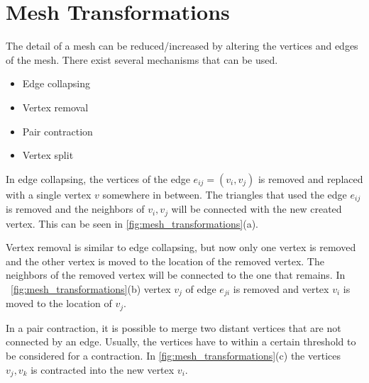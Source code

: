 \iffalse %

============================
 Mesh simplification
============================
* Geometry
  - Mesh decimation
  - Mesh optimization
  - Progressive meshes
  - Surface simplification using quadric error metric
  
* Geometry and appearance attributes
  - Appearance-preserving simplification

  - Texture mapped progressive meshes
  
  - Simplifying surfaces with color and texture using quadric error metric
  - New quadric error metric

  - Image-driven simplification

============================
 Mesh parametrization
============================
  Resample texture
  Ray tracing
  Volume UV
  
\fi %
  
\iffalse %
\section{Mesh Transformations} \label{sec:mesh_transformations}
The detail of a mesh can be reduced/increased by altering the vertices and edges of the mesh. There exist several mechanisms that can be used.

\begin{itemize}
\item Edge collapsing
\item Vertex removal
\item Pair contraction
\item Vertex split
\end{itemize}

In edge collapsing, the vertices of the edge $e_{ij} = (v_i, v_j)$ is removed and replaced with a single vertex $v$ somewhere in between. The triangles that used the edge $e_{ij}$ is removed and the neighbors of $v_i, v_j$ will be connected with the new created vertex. This can be seen in \cref{fig:mesh_transformations}(a).

Vertex removal is similar to edge collapsing, but now only one vertex is removed and the other vertex is moved to the location of the removed vertex. The neighbors of the removed vertex will be connected to the one that remains. In ~\cref{fig:mesh_transformations}(b) vertex $v_j$ of edge $e_{ji}$ is removed and vertex $v_i$ is moved to the location of $v_j$.

In a pair contraction, it is possible to merge two distant vertices that are not connected by an edge. Usually, the vertices have to within a certain threshold to be considered for a contraction. In \cref{fig:mesh_transformations}(c) the vertices $v_j, v_k$ is contracted into the new vertex $v_i$. 


